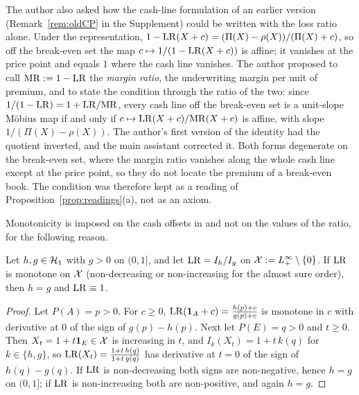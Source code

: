 \begin{discussion}
The author also asked how the cash-line formulation of an earlier version (Remark~\ref{rem:oldCP} in the
Supplement) could be written with the loss ratio alone. Under the representation,
$1-\mathrm{LR}(X+c)=(\Pi(X)-\rho(X))/(\Pi(X)+c)$, so off the break-even set the map $c\mapsto1/(1-\mathrm{LR}(X+c))$ is affine; it
vanishes at the price point and equals $1$ where the cash line vanishes. The author proposed to call
$\mathrm{MR}:=1-\mathrm{LR}$ the \emph{margin ratio}, the underwriting margin per unit of premium, and to state the
condition through the ratio of the two: since $1/(1-\mathrm{LR})=1+\mathrm{LR}/\mathrm{MR}$, every cash line off the break-even set
is a unit-slope Möbius map if and only if $c\mapsto\mathrm{LR}(X+c)/\mathrm{MR}(X+c)$ is affine, with slope
$1/(\Pi(X)-\rho(X))$. The author's first version of the identity had the quotient inverted, and the main assistant
corrected it. Both forms degenerate on the break-even set, where the margin ratio vanishes along the whole cash line
except at the price point, so they do not locate the premium of a break-even book. The condition was therefore kept
as a reading of Proposition~\ref{prop:readings}(a), not as an axiom.
\end{discussion}

Monotonicity is imposed on the cash offsets in \axRM{} and not on the values of the ratio, for the following
reason.

\begin{proposition}\label{prop:F2}
Let $h,g\in\mathcal H_1$ with $g>0$ on $(0,1]$, and let $\mathrm{LR}=I_h/I_g$ on $\mathcal X:=L^\infty_+\setminus\{0\}$.
If $\mathrm{LR}$ is monotone on $\mathcal X$ (non-decreasing or non-increasing for the almost sure order),
then $h=g$ and $\mathrm{LR}\equiv1$.
\end{proposition}

\begin{proof}
Let $P(A)=p>0$. For $c\ge0$, $\mathrm{LR}(\mathbf 1_A+c)=\frac{h(p)+c}{g(p)+c}$ is monotone in $c$ with derivative at
$0$ of the sign of $g(p)-h(p)$. Next let $P(E)=q>0$ and $t\ge0$. Then $X_t=1+t\mathbf 1_E\in\mathcal X$ is
increasing in $t$, and $I_k(X_t)=1+t\,k(q)$ for $k\in\{h,g\}$, so
$\mathrm{LR}(X_t)=\frac{1+t\,h(q)}{1+t\,g(q)}$ has derivative at $t=0$ of the sign of $h(q)-g(q)$. If $\mathrm{LR}$
is non-decreasing both signs are non-negative, hence $h=g$ on $(0,1]$; if $\mathrm{LR}$ is non-increasing both are
non-positive, and again $h=g$. \qedhere
\end{proof}
